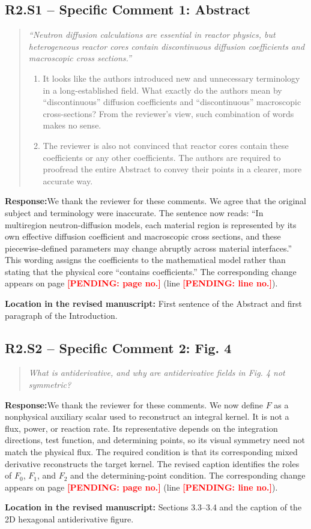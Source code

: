\documentclass[11pt,a4paper]{article}
\newenvironment{reviewercomment}{\begin{quote}\small\itshape\color{commentgray}}{\end{quote}}
\newcommand{\authorresponse}{\noindent\textbf{Response:}\quad}
\newcommand{\revisionlocation}[1]{\par\noindent\textcolor{locationblue}{\textbf{Location in the revised manuscript: }}#1}
\newcommand{\draftplaceholder}[1]{\textcolor{red}{\textbf{[PENDING: #1]}}}
\begin{document}
\subsection*{R2.S1 -- Specific Comment 1: Abstract}
\begin{reviewercomment}
``Neutron diffusion calculations are essential in reactor physics, but heterogeneous reactor cores contain discontinuous diffusion coefficients and macroscopic cross sections.''

\begin{enumerate}[label=\alph*.,leftmargin=2em]
\item It looks like the authors introduced new and unnecessary terminology in a long-established field. What exactly do the authors mean by ``discontinuous'' diffusion coefficients and ``discontinuous'' macroscopic cross-sections? From the reviewer's view, such combination of words makes no sense.
\item The reviewer is also not convinced that reactor cores contain these coefficients or any other coefficients. The authors are required to proofread the entire Abstract to convey their points in a clearer, more accurate way.
\end{enumerate}
\end{reviewercomment}
\authorresponse We thank the reviewer for these comments. We agree that the original subject and terminology were inaccurate. The sentence now reads: “In multiregion neutron-diffusion models, each material region is represented by its own effective diffusion coefficient and macroscopic cross sections, and these piecewise-defined parameters may change abruptly across material interfaces.” This wording assigns the coefficients to the mathematical model rather than stating that the physical core “contains coefficients.” The corresponding change appears on page \draftplaceholder{page no.} (line \draftplaceholder{line no.}).
\revisionlocation{First sentence of the Abstract and first paragraph of the Introduction.}

\subsection*{R2.S2 -- Specific Comment 2: Fig. 4}
\begin{reviewercomment}
What is antiderivative, and why are antiderivative fields in Fig. 4 not symmetric?
\end{reviewercomment}
\authorresponse We thank the reviewer for these comments. We now define $F$ as a nonphysical auxiliary scalar used to reconstruct an integral kernel. It is not a flux, power, or reaction rate. Its representative depends on the integration directions, test function, and determining points, so its visual symmetry need not match the physical flux. The required condition is that its corresponding mixed derivative reconstructs the target kernel. The revised caption identifies the roles of $F_0$, $F_1$, and $F_2$ and the determining-point condition. The corresponding change appears on page \draftplaceholder{page no.} (line \draftplaceholder{line no.}).
\revisionlocation{Sections 3.3--3.4 and the caption of the 2D hexagonal antiderivative figure.}
\end{document}
